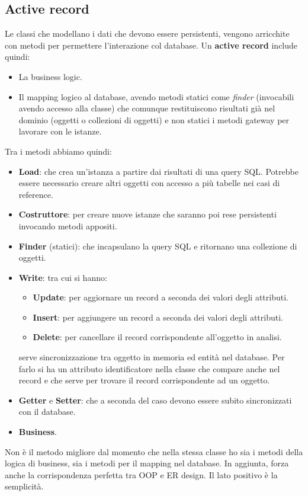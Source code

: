 \subsection{Active record}
Le classi che modellano i dati che devono essere persistenti, vengono arricchite
con metodi per permettere l'interazione col database. Un \textbf{active record}
include quindi:
\begin{itemize}
      \item La business logic.
      \item Il mapping logico al database, avendo  metodi statici come
            \textit{finder} (invocabili avendo accesso alla classe) che comunque
            restituiscono risultati già nel dominio (oggetti o collezioni di
            oggetti) e non statici i metodi gateway per lavorare con le istanze.
\end{itemize}
Tra i metodi abbiamo quindi:
\begin{itemize}
      \item \textbf{Load}: che crea un'istanza a partire dai risultati di una
            query SQL. Potrebbe essere necessario creare altri oggetti con
            accesso a più tabelle nei casi di reference.
      \item \textbf{Costruttore}: per creare nuove istanze che saranno poi rese
            persistenti invocando metodi appositi.
      \item \textbf{Finder} (statici): che incapsulano la query SQL e ritornano
            una collezione di oggetti.
      \item \textbf{Write}: tra cui si hanno:
            \begin{itemize}
                  \item \textbf{Update}: per aggiornare un record a seconda dei
                        valori degli attributi.
                  \item \textbf{Insert}: per aggiungere un record a seconda dei
                        valori degli attributi.
                  \item \textbf{Delete}: per cancellare il record corrispondente
                        all'oggetto in analisi.
            \end{itemize}
            serve sincronizzazione tra oggetto in memoria ed entità nel database.
            Per farlo si ha un attributo identificatore nella classe che compare
            anche nel record e che serve per trovare il record corrispondente ad
            un oggetto.
      \item \textbf{Getter} e \textbf{Setter}: che a seconda del caso devono
            essere subito sincronizzati con il database.
      \item \textbf{Business}.
\end{itemize}
Non è il metodo migliore dal momento che nella stessa classe ho sia i metodi
della logica di business, sia i metodi per il mapping nel database. In aggiunta,
forza anche la corrispondenza perfetta tra OOP e ER design. Il lato positivo è
la semplicità.
